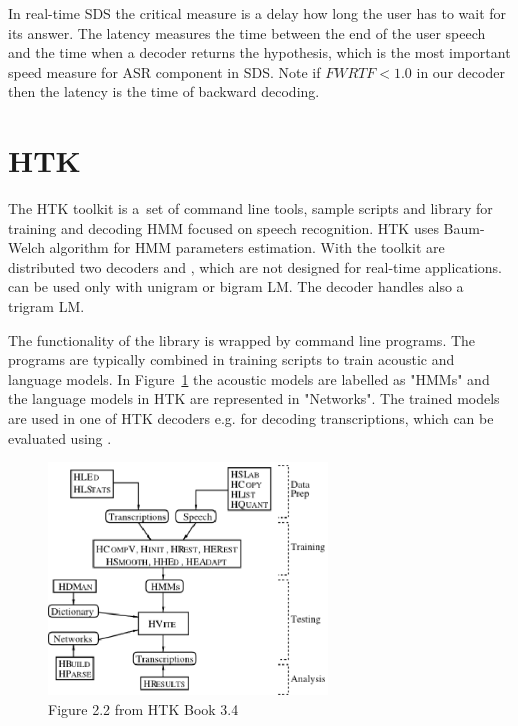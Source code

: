 {
In real-time \ac{SDS} the critical measure is a delay how long the user
has to wait for its answer.
The latency measures the time between the end of the user speech and
the time when a decoder returns the hypothesis, 
which is the most important speed measure for \ac{ASR} component in \ac{SDS}.
Note if $FWRTF < 1.0 $ in our decoder then the latency is the time of backward decoding.


\section{\ac{HTK}}
\label{sec:back_htk}
The \ac{HTK} toolkit is a~set of command line tools, sample scripts and library
for training and decoding \ac{HMM} focused on speech recognition.
\ac{HTK} uses Baum-Welch algorithm for \ac{HMM} parameters estimation.
With the toolkit are distributed two decoders  and ,
which are not designed for real-time applications.
 can be used only with unigram or bigram \ac{LM}. 
The  decoder handles also a trigram \ac{LM}.

The functionality of the library is wrapped by command line programs.
The programs are typically combined in training scripts to train acoustic and language models.
In Figure~\ref{fig:htk_tools} the acoustic models are labelled as "HMMs" 
and the language models in \ac{HTK} are represented in "Networks".
The trained models are used in one of \ac{HTK} decoders e.g.  for decoding
transcriptions, which can be evaluated using .

\begin{figure}[!htp]
    \begin{center}
    \includegraphics[width=20em]{images/htk_tools.ps}
    \caption{Figure 2.2 from HTK Book 3.4\cite{young2006htk}}
    \label{fig:htk_tools} 
    \end{center}
\end{figure}

}
